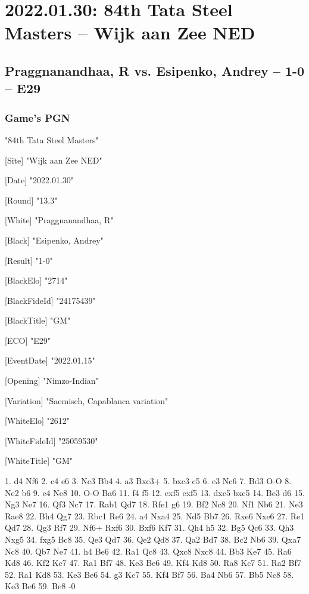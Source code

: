 \documentclass[9pt]{extarticle}
\begin{document}
\section*{2022.01.30: 84th Tata Steel Masters -- Wijk aan Zee NED}

\subsection*{Praggnanandhaa, R vs. Esipenko, Andrey -- 1-0 -- E29}
\subsubsection*{Game's PGN}
\begin{flushleft}
[Event] "84th Tata Steel Masters"

[Site] "Wijk aan Zee NED"

[Date] "2022.01.30"

[Round] "13.3"

[White] "Praggnanandhaa, R"

[Black] "Esipenko, Andrey"

[Result] "1-0"

[BlackElo] "2714"

[BlackFideId] "24175439"

[BlackTitle] "GM"

[ECO] "E29"

[EventDate] "2022.01.15"

[Opening] "Nimzo-Indian"

[Variation] "Saemisch, Capablanca variation"

[WhiteElo] "2612"

[WhiteFideId] "25059530"

[WhiteTitle] "GM"

\end{flushleft}
\begin{flushleft}
1. d4 Nf6 2. c4 e6 3. Nc3 Bb4 4. a3 Bxc3+ 5. bxc3 c5 6. e3 Nc6 7. Bd3 O-O 8. Ne2 b6 9. e4 Ne8 10. O-O Ba6 11. f4 f5 12. exf5 exf5 13. dxc5 bxc5 14. Be3 d6 15. Ng3 Ne7 16. Qf3 Nc7 17. Rab1 Qd7 18. Rfe1 g6 19. Bf2 Nc8 20. Nf1 Nb6 21. Ne3 Rae8 22. Bh4 Qg7 23. Rbc1 Re6 24. a4 Nxa4 25. Nd5 Bb7 26. Rxe6 Nxe6 27. Re1 Qd7 28. Qg3 Rf7 29. Nf6+ Rxf6 30. Bxf6 Kf7 31. Qh4 h5 32. Bg5 Qc6 33. Qh3 Nxg5 34. fxg5 Bc8 35. Qe3 Qd7 36. Qe2 Qd8 37. Qa2 Bd7 38. Bc2 Nb6 39. Qxa7 Nc8 40. Qb7 Ne7 41. h4 Be6 42. Ra1 Qc8 43. Qxc8 Nxc8 44. Bb3 Ke7 45. Ra6 Kd8 46. Kf2 Kc7 47. Ra1 Bf7 48. Ke3 Be6 49. Kf4 Kd8 50. Ra8 Kc7 51. Ra2 Bf7 52. Ra1 Kd8 53. Ke3 Be6 54. g3 Kc7 55. Kf4 Bf7 56. Ba4 Nb6 57. Bb5 Nc8 58. Ke3 Be6 59. Be8 \quad  {}-0
\end{flushleft}
\end{document}
